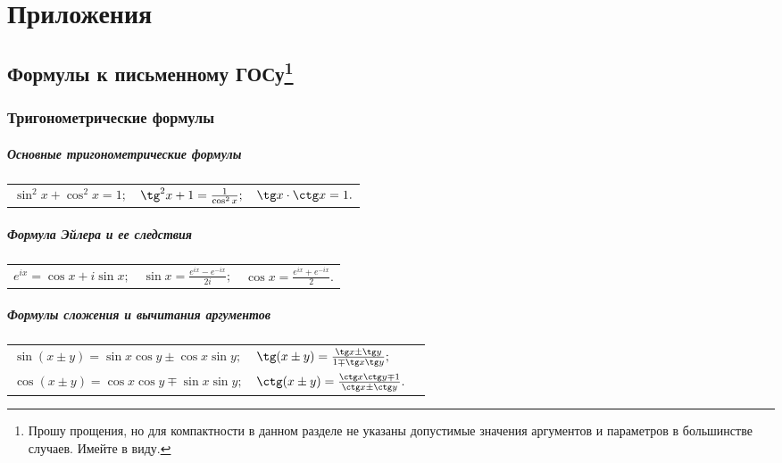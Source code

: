 \renewcommand*{\arraystretch}{1.5}
\everymath{\displaystyle}

\part{Приложения}
\chapter[Формулы к письменному ГОСу]{Формулы к письменному ГОСу\footnote{Прошу прощения, но для компактности в данном разделе не указаны допустимые значения аргументов и параметров в большинстве случаев. Имейте в виду.}}

\section{Тригонометрические формулы}

\subsubsection{Основные тригонометрические формулы}
\begin{longtable}[l]{l l l}
$\sin^2x+\cos^2x=1;$
&
$\tg^2x+1=\frac{1}{\cos^2x};$
&
$\tg x\cdot\ctg x=1.$
\end{longtable}

\subsubsection{Формула Эйлера и ее следствия}
\begin{longtable}[l]{ l l l}
$e^{ix} = \cos x + i \sin x;$
&
$\sin x = \frac{e^{ix}-e^{-ix}}{2i};$
&
$\cos x = \frac{e^{ix}+e^{-ix}}{2}.$
\end{longtable}

\subsubsection{Формулы сложения и вычитания аргументов}
\begin{longtable}[l]{l l l}
$\sin(x\pm y)=\sin x \cos y \pm \cos x \sin y;$
&
$\tg(x\pm y)=\frac{\tg x \pm \tg y}{1 \mp \tg x\tg y};$
\\
$\cos(x\pm y)= \cos x \cos y \mp \sin x \sin y;$
&
$\ctg(x\pm y)=\frac{\ctg x\ctg y \mp 1}{\ctg x \pm \ctg y}.$
\end{longtable}

